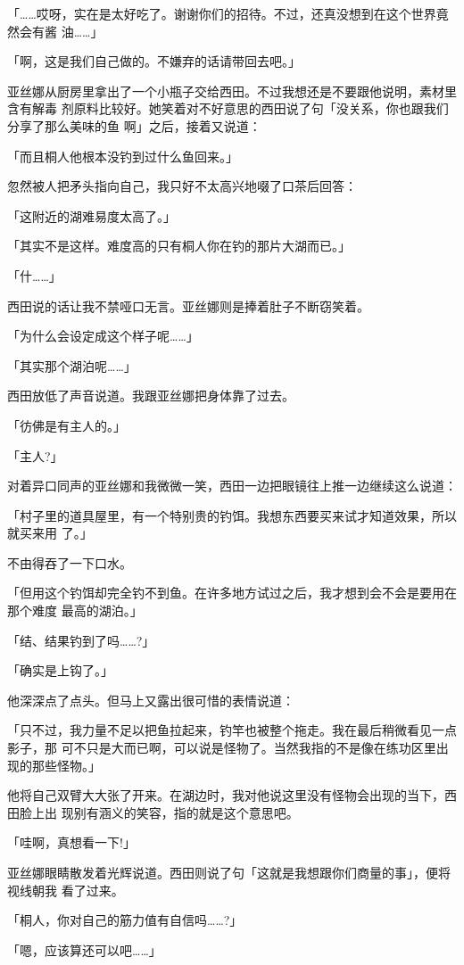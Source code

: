 \documentclass[11pt]{book}
\begin{document}
「……哎呀，实在是太好吃了。谢谢你们的招待。不过，还真没想到在这个世界竟然会有酱
油……」

「啊，这是我们自己做的。不嫌弃的话请带回去吧。」

亚丝娜从厨房里拿出了一个小瓶子交给西田。不过我想还是不要跟他说明，素材里含有解毒
剂原料比较好。她笑着对不好意思的西田说了句「没关系，你也跟我们分享了那么美味的鱼
啊」之后，接着又说道：

「而且桐人他根本没钓到过什么鱼回来。」

忽然被人把矛头指向自己，我只好不太高兴地啜了口茶后回答：

「这附近的湖难易度太高了。」

「其实不是这样。难度高的只有桐人你在钓的那片大湖而已。」

「什……」

西田说的话让我不禁哑口无言。亚丝娜则是捧着肚子不断窃笑着。

「为什么会设定成这个样子呢……」

「其实那个湖泊呢……」

西田放低了声音说道。我跟亚丝娜把身体靠了过去。

「彷佛是有主人的。」

「主人?」

对着异口同声的亚丝娜和我微微一笑，西田一边把眼镜往上推一边继续这么说道：

「村子里的道具屋里，有一个特别贵的钓饵。我想东西要买来试才知道效果，所以就买来用
了。」

不由得吞了一下口水。

「但用这个钓饵却完全钓不到鱼。在许多地方试过之后，我才想到会不会是要用在那个难度
最高的湖泊。」

「结、结果钓到了吗……?」

「确实是上钩了。」

他深深点了点头。但马上又露出很可惜的表情说道：

「只不过，我力量不足以把鱼拉起来，钓竿也被整个拖走。我在最后稍微看见一点影子，那
可不只是大而已啊，可以说是怪物了。当然我指的不是像在练功区里出现的那些怪物。」

他将自己双臂大大张了开来。在湖边时，我对他说这里没有怪物会出现的当下，西田脸上出
现别有涵义的笑容，指的就是这个意思吧。

「哇啊，真想看一下!」

亚丝娜眼睛散发着光辉说道。西田则说了句「这就是我想跟你们商量的事」，便将视线朝我
看了过来。

「桐人，你对自己的筋力值有自信吗……?」

「嗯，应该算还可以吧……」
\end{document}
